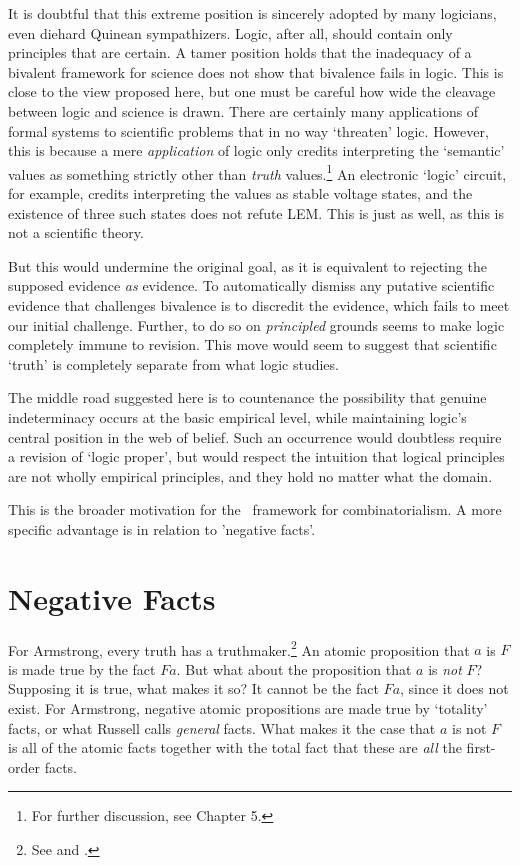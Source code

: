 It is doubtful that this extreme position is sincerely adopted by many logicians, even diehard Quinean sympathizers. Logic, after all, should contain only principles that are certain. A tamer position holds that the inadequacy of a bivalent framework for science does not show that bivalence fails in logic. This is close to the view proposed here, but one must be careful how wide the cleavage between logic and science is drawn. There are certainly many applications of formal systems to scientific problems that in no way `threaten' logic. However, this is because a mere \emph{application} of logic only credits interpreting the `semantic' values as something strictly other than \emph{truth} values.\footnote{For further discussion, see Chapter 5.} An electronic `logic' circuit, for example, credits interpreting the values as stable voltage states, and the existence of three such states does not refute LEM. This is just as well, as this is not a scientific theory. 

But this would undermine the original goal, as it is equivalent to rejecting the supposed evidence \emph{as} evidence. To automatically dismiss any putative scientific evidence that challenges bivalence is to discredit the evidence, which fails to meet our initial challenge. Further, to do so on \emph{principled} grounds seems to make logic completely immune to revision. This move would seem to suggest that scientific `truth' is completely separate from what logic studies. 

The middle road suggested here is to countenance the possibility that genuine indeterminacy occurs at the basic empirical level, while maintaining logic's central position in the web of belief. Such an occurrence would doubtless require a revision of `logic proper', but would respect the intuition that logical principles are not wholly empirical principles, and they hold no matter what the domain. 

This is the broader motivation for the \GOModal\ framework for combinatorialism. A more specific advantage is in relation to 'negative facts'.
\section{Negative Facts}\label{negativeFacts}

For Armstrong, every truth has a truthmaker.\footnote{See \citeyear[p. 150]{Armstrong:2000} and \citeyear[pp. 5, 19]{Armstrong2004}.} An atomic proposition that $a$ is $F$ is made true by the fact $Fa$. But what about the proposition that $a$ is \emph{not} $F$? Supposing it is true, what makes it so? It cannot be the fact $Fa$, since it does not exist. For Armstrong, negative atomic propositions are made true by `totality' facts, or what Russell \citeyear{Russell:18} calls \emph{general} facts. What makes it the case that $a$ is not $F$ is all of the atomic facts together with the total fact that these are \emph{all} the first-order facts.


